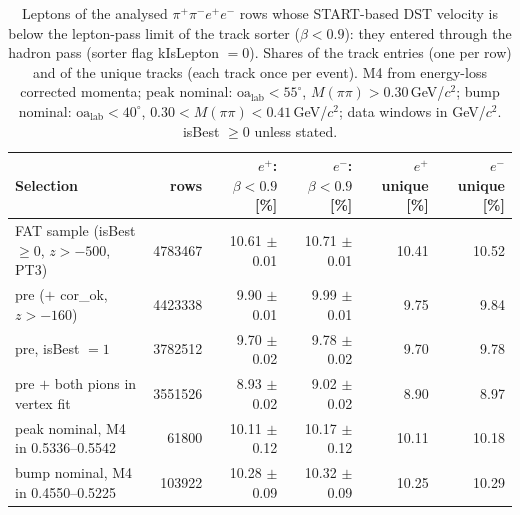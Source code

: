 \begin{table}[H]
\centering
\caption{Leptons of the analysed $\pi^+\pi^-e^+e^-$ rows whose START-based DST velocity is below the lepton-pass limit of the track sorter ($\beta<0.9$): they entered through the hadron pass (sorter flag kIsLepton $=0$). Shares of the track entries (one per row) and of the unique tracks (each track once per event). M4 from energy-loss corrected momenta; peak nominal: $\mathrm{oa_{lab}}<55^\circ$, $M(\pi\pi)>0.30$\,GeV/$c^2$; bump nominal: $\mathrm{oa_{lab}}<40^\circ$, $0.30<M(\pi\pi)<0.41$\,GeV/$c^2$; data windows in GeV/$c^2$. isBest $\geq 0$ unless stated.}
\label{tab:pid_dstbeta}
\footnotesize
\setlength{\tabcolsep}{4pt}
\begin{tabular}{@{}l r r r r r@{}}
\toprule
Selection & rows & $e^+$: $\beta<0.9$ [\%] & $e^-$: $\beta<0.9$ [\%] & $e^+$ unique [\%] & $e^-$ unique [\%] \\
\midrule
FAT sample (isBest $\geq 0$, $z>-500$, PT3) & 4783467 & 10.61 $\pm$ 0.01 & 10.71 $\pm$ 0.01 & 10.41 & 10.52 \\
pre ($+$ cor\_ok, $z>-160$) & 4423338 & 9.90 $\pm$ 0.01 & 9.99 $\pm$ 0.01 & 9.75 & 9.84 \\
pre, isBest $=1$ & 3782512 & 9.70 $\pm$ 0.02 & 9.78 $\pm$ 0.02 & 9.70 & 9.78 \\
pre $+$ both pions in vertex fit & 3551526 & 8.93 $\pm$ 0.02 & 9.02 $\pm$ 0.02 & 8.90 & 8.97 \\
peak nominal, M4 in 0.5336--0.5542 & 61800 & 10.11 $\pm$ 0.12 & 10.17 $\pm$ 0.12 & 10.11 & 10.18 \\
bump nominal, M4 in 0.4550--0.5225 & 103922 & 10.28 $\pm$ 0.09 & 10.32 $\pm$ 0.09 & 10.25 & 10.29 \\
\bottomrule
\end{tabular}
\end{table}
